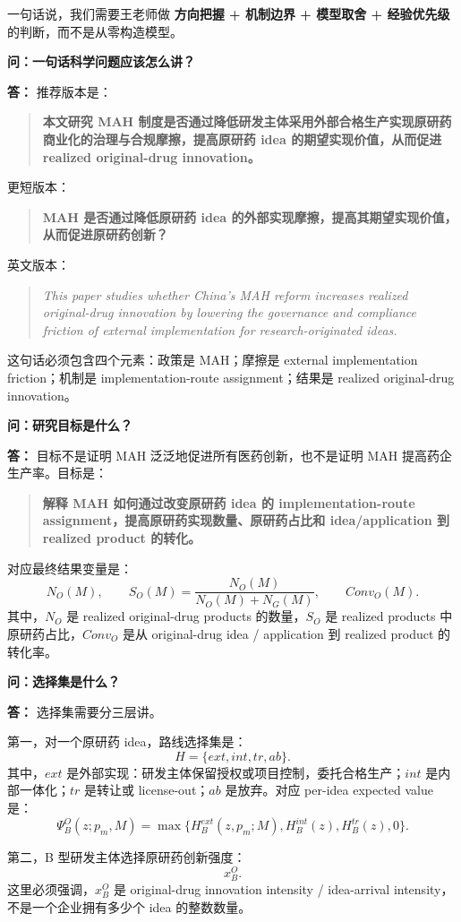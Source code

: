 \documentclass[10pt]{ctexart}
\newcommand{\qtitle}[1]{\vspace{0.35em}\noindent\textbf{问：#1}\par\vspace{0.15em}\noindent\textbf{答：}}
\newcommand{\key}[1]{\textbf{#1}}
\begin{document}
一句话说，我们需要王老师做 \key{方向把握 + 机制边界 + 模型取舍 + 经验优先级} 的判断，而不是从零构造模型。

\qtitle{一句话科学问题应该怎么讲？}
推荐版本是：
\begin{quote}
\key{本文研究 MAH 制度是否通过降低研发主体采用外部合格生产实现原研药商业化的治理与合规摩擦，提高原研药 idea 的期望实现价值，从而促进 realized original-drug innovation。}
\end{quote}

更短版本：
\begin{quote}
\key{MAH 是否通过降低原研药 idea 的外部实现摩擦，提高其期望实现价值，从而促进原研药创新？}
\end{quote}

英文版本：
\begin{quote}
\textit{This paper studies whether China’s MAH reform increases realized original-drug innovation by lowering the governance and compliance friction of external implementation for research-originated ideas.}
\end{quote}

这句话必须包含四个元素：政策是 MAH；摩擦是 external implementation friction；机制是 implementation-route assignment；结果是 realized original-drug innovation。

\qtitle{研究目标是什么？}
目标不是证明 MAH 泛泛地促进所有医药创新，也不是证明 MAH 提高药企生产率。目标是：
\begin{quote}
\key{解释 MAH 如何通过改变原研药 idea 的 implementation-route assignment，提高原研药实现数量、原研药占比和 idea/application 到 realized product 的转化。}
\end{quote}

对应最终结果变量是：
\[
N_O(M),\qquad
S_O(M)=\frac{N_O(M)}{N_O(M)+N_G(M)},\qquad
Conv_O(M).
\]
其中，\(N_O\) 是 realized original-drug products 的数量，\(S_O\) 是 realized products 中原研药占比，\(Conv_O\) 是从 original-drug idea / application 到 realized product 的转化率。

\qtitle{选择集是什么？}
选择集需要分三层讲。

第一，对一个原研药 idea，路线选择集是：
\[
H=\{ext,int,tr,ab\}.
\]
其中，\(ext\) 是外部实现：研发主体保留授权或项目控制，委托合格生产；\(int\) 是内部一体化；\(tr\) 是转让或 license-out；\(ab\) 是放弃。对应 per-idea expected value 是：
\[
\Psi_B^O(z;p_m,M)=\max\{H_B^{ext}(z,p_m;M),H_B^{int}(z),H_B^{tr}(z),0\}.
\]

第二，B 型研发主体选择原研药创新强度：
\[
x_B^O.
\]
这里必须强调，\(x_B^O\) 是 original-drug innovation intensity / idea-arrival intensity，不是一个企业拥有多少个 idea 的整数数量。
\end{document}
